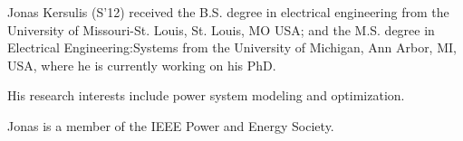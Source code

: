 \documentclass[journal,twoside]{IEEEtran}
\begin{document}







%
%
%

\newpage
% 

\begin{IEEEbiography}{Jonas Kersulis}
(S'12) received the B.S. degree in electrical engineering from the University of Missouri-St. Louis, St. Louis, MO USA; and the M.S. degree in Electrical Engineering:Systems from the University of Michigan, Ann Arbor, MI, USA, where he is currently working on his PhD.

His research interests include power system modeling and optimization.

Jonas is a member of the IEEE Power and Energy Society.
\end{IEEEbiography}
\end{document}
